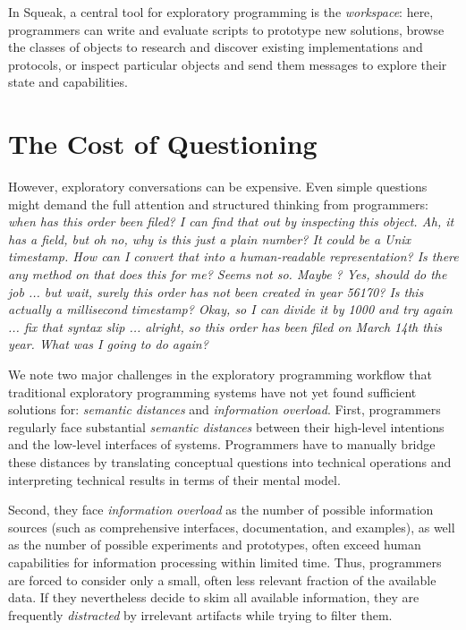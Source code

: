 In Squeak, a central tool for exploratory programming is the \emph{workspace}:
here, programmers can write and evaluate scripts to prototype new solutions, browse the classes of objects to research and discover existing implementations and protocols, or inspect particular objects and send them messages to explore their state and capabilities.

\section*{The Cost of Questioning}

However, exploratory conversations can be expensive.
Even simple questions might demand the full attention and structured thinking from programmers:
\emph{%
	\label{ex:introduction/order}
	when has this order been filed? I can find that out by inspecting this object. Ah, it has a  field, but oh no, why is this just a plain number? It could be a Unix timestamp. How can I convert that into a human-readable representation? Is there any method on  that does this for me? Seems not so. Maybe ? Yes,  should do the job ... but wait, surely this order has not been created in year 56170? Is this actually a millisecond timestamp? Okay, so I can divide it by 1000 and try again ... fix that syntax slip ... alright, so this order has been filed on March 14th this year. What was I going to do again?
}%

We note two major challenges in the exploratory programming workflow that traditional exploratory programming systems have not yet found sufficient solutions for: \emph{semantic distances} and \emph{information overload}.
First, programmers regularly face substantial \emph{semantic distances} between their high-level intentions and the low-level interfaces of systems.
Programmers have to manually bridge these distances by translating conceptual questions into technical operations and interpreting technical results in terms of their mental model.

Second, they face \emph{information overload} as the number of possible information sources (such as comprehensive interfaces, documentation, and examples), as well as the number of possible experiments and prototypes, often exceed human capabilities for information processing within limited time.
Thus, programmers are forced to consider only a small, often less relevant fraction of the available data.
If they nevertheless decide to skim all available information, they are frequently \emph{distracted} by irrelevant artifacts while trying to filter them.


